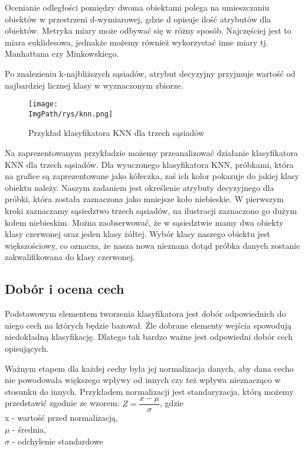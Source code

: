 \documentclass[a4paper,12pt,twoside,openany]{report}
\newcommand{\ImgPath}{.}
\begin{document}
Ocenianie odległości pomiędzy dwoma obiektami polega na umieszczaniu obiektów w przestrzeni d-wymiarowej, gdzie d opisuje ilość atrybutów dla obiektów. Metryka miary może odbywać się w różny sposób. Najczęściej jest to miara euklidesowa, jednakże możemy również wykorzystać inne miary tj. Manhattana czy Minkowskiego. 

Po znalezieniu k-najbliższych sąsiadów, atrybut decyzyjny przyjmuje wartość od najbardziej licznej klasy w wyznaczonym zbiorze.

\begin{figure}[H]	
	\centering
	\texttt{[image: \\ImgPath/rys/knn.png]}
	
	\caption{Przykład klasyfikatora KNN dla trzech sąsiadów}
\end{figure}

Na zaprezentowanym przykładzie możemy przeanalizować działanie klasyfikatora KNN dla trzech sąsiadów. Dla wyuczonego klasyfikatora KNN, próbkami, która na grafice są zaprezentowane jako kółeczka, zaś ich kolor pokazuje do jakiej klasy obiektu należy. Naszym zadaniem jest określenie atrybuty decyzyjnego dla próbki, która została zaznaczona jako mniejsze koło niebieskie. W pierwszym kroki zaznaczamy sąsiedztwo trzech sąsiadów, na ilustracji zaznaczono go dużym kołem niebieskim. Można zaobserwować, że w sąsiedztwie mamy dwa obiekty klasy czerwonej oraz jeden klasy żółtej. Wybór klasy naszego obiektu jest większościowy, co oznacza, że nasza nowa nieznana dotąd próbka danych zostanie zakwalifikowana do klasy czerwonej.


\subsection{Dobór i ocena cech}
Podstawowym elementem tworzenia klasyfikatora jest dobór odpowiednich do niego cech na których będzie bazował. Źle dobrane elementy wejścia spowodują niedokładną klasyfikację. Dlatego tak bardzo ważne jest odpowiedni dobór cech opisujących.

Ważnym etapem dla każdej cechy była jej normalizacja danych, aby dana cecho nie powodowała większego wpływy od innych czy też wpływa nieznacząco w stosunku do innych. Przykładem normalizacji jest standaryzacja, którą możemy przedstawić zgodnie ze wzorem: $ Z = \dfrac{x - \mu}{\sigma} $, gdzie 
\\ x - wartość przed normalizacją, \\ $\mu$ - średnia, \\ $\sigma$ - odchylenie standardowe
\end{document}
